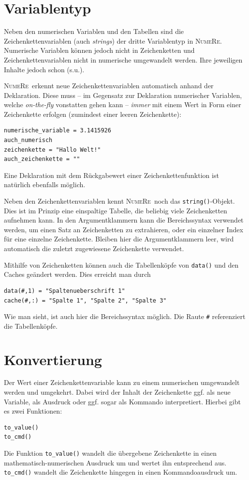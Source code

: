 \documentclass[DIV=14,headsepline,footsepline]{scrbook}
\newcommand{\NR}{\textsc{Nu\-me\-Re}}
\begin{document}
			\section{Variablentyp}
				Neben den numerischen Variablen und den Tabellen sind die Zeichenkettenvariablen (auch \emph{strings}) der dritte Variablentyp in \NR. Numerische Variablen können jedoch nicht in Zeichenketten und Zeichenkettenvariablen nicht in numerische umgewandelt werden. Ihre jeweiligen Inhalte jedoch schon (s.u.).
				
				\NR\ erkennt neue Zeichenkettenvariablen automatisch anhand der Deklaration. Diese muss -- im Gegensatz zur Deklaration numerischer Variablen, welche \emph{on-the-fly} vonstatten gehen kann -- \emph{immer} mit einem Wert in Form einer Zeichenkette erfolgen (zumindest einer leeren Zeichenkette):
				\begin{lstlisting}
numerische_variable = 3.1415926
auch_numerisch
zeichenkette = "Hallo Welt!"
auch_zeichenkette = ""
				\end{lstlisting}
				Eine Deklaration mit dem Rückgabewert einer Zeichenkettenfunktion ist natürlich ebenfalls möglich.
				
				Neben den Zeichenkettenvariablen kennt \NR\ noch das \verb+string()+-Objekt. Dies ist im Prinzip eine einspaltige Tabelle, die beliebig viele Zeichenketten aufnehmen kann. In den Argumentklammern kann die Bereichssyntax verwendet werden, um einen Satz an Zeichenketten zu extrahieren, oder ein einzelner Index für eine einzelne Zeichenkette. Bleiben hier die Argumentklammern leer, wird automatisch die zuletzt zugewiesene Zeichenkette verwendet.
				
				Mithilfe von Zeichenketten können auch die Tabellenköpfe von \verb+data()+ und den Caches geändert werden. Dies erreicht man durch
				\begin{lstlisting}
data(#,1) = "Spaltenueberschrift 1"
cache(#,:) = "Spalte 1", "Spalte 2", "Spalte 3"
				\end{lstlisting}
				Wie man sieht, ist auch hier die Bereichssyntax möglich. Die Raute \verb+#+ referenziert die Tabellenköpfe.
				
			\section{Konvertierung}
				Der Wert einer Zeichenkettenvariable kann zu einem numerischen umgewandelt werden und umgekehrt. Dabei wird der Inhalt der Zeichenkette ggf. als neue Variable, als Ausdruck oder ggf. sogar als Kommando interpretiert. Hierbei gibt es zwei Funktionen:
				\begin{lstlisting}
to_value()
to_cmd()
				\end{lstlisting}
				Die Funktion \verb+to_value()+ wandelt die übergebene Zeichenkette in einen ma\-the\-ma\-tisch-nu\-me\-ri\-schen Ausdruck um und wertet ihn entsprechend aus. \verb+to_cmd()+ wandelt die Zeichenkette hingegen in einen Kommandoausdruck um.
				
\end{document}
